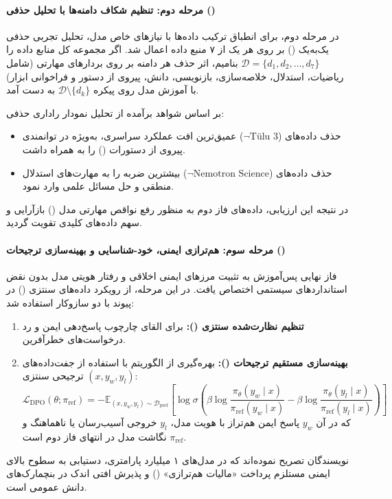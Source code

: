 \paragraph*{مرحله دوم: تنظیم شکاف دامنه‌ها با تحلیل حذفی ()}
در مرحله دوم، برای انطباق ترکیب داده‌ها با نیازهای خاص مدل، تحلیل تجربی حذفی یک‌به‌یک () بر روی هر یک از ۷ منبع داده اعمال شد. اگر مجموعه کل منابع داده را $\mathcal{D} = \{d_1, d_2, \dots, d_7\}$ بنامیم، اثر حذف هر دامنه بر روی بردارهای مهارتی (شامل ریاضیات، استدلال، خلاصه‌سازی، بازنویسی، دانش، پیروی از دستور و فراخوانی ابزار) با آموزش مدل روی پیکره $\mathcal{D} \setminus \{d_k\}$ به دست آمد.

بر اساس شواهد برآمده از تحلیل نمودار راداری حذفی:
\begin{itemize}
    \item حذف داده‌های  ($\neg\text{Tülu 3}$) عمیق‌ترین افت عملکرد سراسری، به‌ویژه در توانمندی پیروی از دستورات () را به همراه داشت.
    \item حذف داده‌های  ($\neg\text{Nemotron Science}$) بیشترین ضربه را به مهارت‌های استدلال منطقی و حل مسائل علمی وارد نمود.
\end{itemize}
در نتیجه این ارزیابی، داده‌های فاز دوم به منظور رفع نواقص مهارتی مدل () بازآرایی و سهم داده‌های کلیدی تقویت گردید.

\paragraph*{مرحله سوم: هم‌ترازی ایمنی، خود-شناسایی و بهینه‌سازی ترجیحات ()}
فاز نهایی پس‌آموزش به تثبیت مرزهای ایمنی اخلاقی و رفتار هویتی مدل بدون نقض استانداردهای سیستمی اختصاص یافت. در این مرحله، از رویکرد داده‌های سنتزی () در پیوند با دو سازوکار استفاده شد:
\begin{enumerate}
    \item \textbf{تنظیم نظارت‌شده سنتزی ():} برای القای چارچوب پاسخ‌دهی ایمن و رد درخواست‌های خطرآفرین.
    \item \textbf{بهینه‌سازی مستقیم ترجیحات ():} بهره‌گیری از الگوریتم  \cite{rafailov2024direct} با استفاده از جفت‌داده‌های ترجیحی سنتزی $(x, y_w, y_l)$:
    \begin{equation}
        \mathcal{L}_{\text{DPO}}(\theta; \pi_{\text{ref}}) = -\mathbb{E}_{(x, y_w, y_l) \sim \mathcal{D}_{\text{pref}}} \left[ \log \sigma \left( \beta \log \frac{\pi_\theta(y_w \mid x)}{\pi_{\text{ref}}(y_w \mid x)} - \beta \log \frac{\pi_\theta(y_l \mid x)}{\pi_{\text{ref}}(y_l \mid x)} \right) \right]
    \end{equation}
    که در آن $y_w$ پاسخ ایمن هم‌تراز با هویت مدل، $y_l$ خروجی آسیب‌رسان یا ناهماهنگ و $\pi_{\text{ref}}$ نگاشت مدل در انتهای فاز دوم است.
\end{enumerate}
نویسندگان تصریح نموده‌اند که در مدل‌های ۱ میلیارد پارامتری، دستیابی به سطوح بالای ایمنی مستلزم پرداخت «مالیات هم‌ترازی» () و پذیرش افتی اندک در بنچمارک‌های دانش عمومی است.

